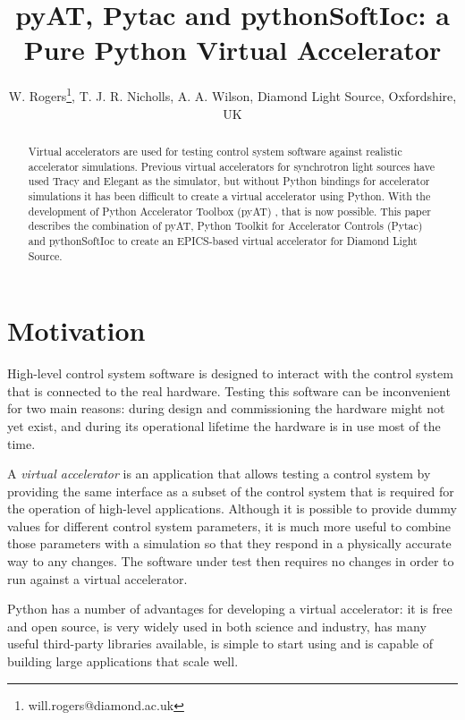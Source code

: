 \documentclass[a4paper,
               keeplastbox,   %
               ]{jacow}
\begin{document}
\title{pyAT, Pytac and pythonSoftIoc: a Pure Python Virtual Accelerator} 

\author{W. Rogers\thanks{will.rogers@diamond.ac.uk}, T. J. R. Nicholls, A. A. Wilson, Diamond Light Source, Oxfordshire, UK}
	
\maketitle

\begin{abstract}
Virtual accelerators are used for testing control system software against
realistic accelerator simulations. Previous virtual accelerators for 
synchrotron light sources have used Tracy \cite{tracy} and Elegant \cite{elegant} as the simulator,
but without Python bindings for accelerator simulations it has been difficult 
to create a virtual accelerator using Python. With the development of 
Python Accelerator Toolbox (pyAT) \cite{pyat}, that is now possible. This paper 
describes the combination of pyAT, Python Toolkit for Accelerator Controls 
(Pytac) and pythonSoftIoc to create an EPICS-based virtual accelerator for 
Diamond Light Source.
\end{abstract}

\section{Motivation}

High-level control system software is designed to interact with the control system
that is connected to the real hardware. Testing this software can be inconvenient
for two main reasons: during design and commissioning the hardware might not
yet exist, and during its operational lifetime the hardware is in use most of
the time.

A \textit{virtual accelerator} is an application that allows testing a control
system by providing the same interface as a subset of the control system that 
is required for the operation of high-level applications. Although it is possible
to provide dummy values for different control system parameters, it is much more 
useful to combine those parameters with a simulation so that they respond in a 
physically accurate way to any changes. The software under test then requires no 
changes in order to run against a virtual accelerator.

Python has a number of advantages for developing a virtual accelerator:
it is free and open source, is very widely used in both science and industry,
has many useful third-party libraries available, is simple to start using
and is capable of building large applications that scale well.
\end{document}
